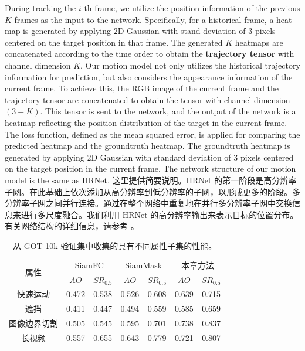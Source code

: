 During tracking the $i$-th frame, we utilize the position information of the previous $K$ frames as the input to the network.
Specifically, for a historical frame, a heat map is generated by applying 2D Gaussian with stand deviation of 3 pixels centered on the target position in that frame.
The generated $K$ heatmaps are concatenated according to the time order to obtain the \textbf{trajectory tensor} with channel dimension $K$.
Our motion model not only utilizes the historical trajectory information for prediction, but also considers the appearance information of the current frame.
To achieve this, the RGB image of the current frame and the trajectory tensor are concatenated to obtain the tensor with channel dimension $(3+K)$. This tensor is sent to the network, and the output of the network is a heatmap reflecting the position distribution of the target in the current frame. The loss function, defined as the mean squared error, is applied for comparing the predicted heatmap and the groundtruth heatmap. The groundtruth heatmap is generated by applying 2D Gaussian with standard deviation of 3 pixels centered on the target position in the current frame. The network structure of our motion model is the same as HRNet. 
\fi
这里提供简要说明。HRNet 的第一阶段是高分辨率子网。在此基础上依次添加从高分辨率到低分辨率的子网，以形成更多的阶段。多分辨率子网之间并行连接。通过在整个网络中重复地在并行多分辨率子网中交换信息来进行多尺度融合。我们利用 HRNet 的高分辨率输出来表示目标的位置分布。有关网络结构的详细信息，请参考 \cite{sun2019deep}。

\begin{table}[t]
\centering
\caption{从 GOT-10k 验证集中收集的具有不同属性子集的性能。}
\begin{tabular}{@{}ccccccc@{}}
\toprule
\multirow{2}{*}{属性} & \multicolumn{2}{c}{SiamFC} & \multicolumn{2}{c}{SiamMask} & \multicolumn{2}{c}{本章方法} \\ \cmidrule(lr){2-3} \cmidrule(lr){4-5} \cmidrule(lr){6-7} 
 & $AO$ & $SR_{0.5}$ & $AO$ & $SR_{0.5}$ & $AO$ & $SR_{0.5}$ \\ \midrule
快速运动 & 0.472 & 0.538 & 0.526 & 0.608 & 0.639 & 0.715 \\
遮挡 & 0.411 & 0.447 & 0.494 & 0.559 & 0.585 & 0.659 \\
图像边界切割 & 0.505 & 0.545 & 0.595 & 0.701 & 0.738 & 0.837 \\
长视频 & 0.557 & 0.655 & 0.643 & 0.779 & 0.721 & 0.807 \\ \bottomrule
\end{tabular}%
\label{table:attribute}
\end{table}

